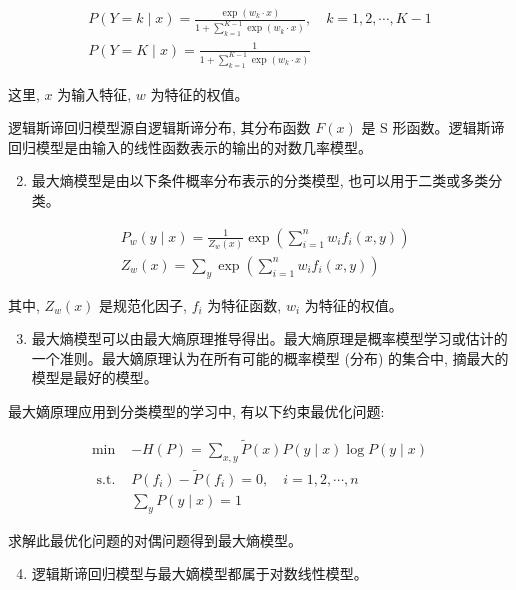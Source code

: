 \documentclass[10pt]{article}
\begin{document}
\begin{CJK*}{UTF8}{bsmi}
$$
\begin{gathered}
P(Y=k \mid x)=\frac{\exp \left(w_{k} \cdot x\right)}{1+\sum_{k=1}^{K-1} \exp \left(w_{k} \cdot x\right)}, \quad k=1,2, \cdots, K-1 \\
P(Y=K \mid x)=\frac{1}{1+\sum_{k=1}^{K-1} \exp \left(w_{k} \cdot x\right)}
\end{gathered}
$$

这里, $x$ 为输入特征, $w$ 为特征的权值。

逻辑斯谛回归模型源自逻辑斯谛分布, 其分布函数 $F(x)$ 是 $\mathrm{S}$ 形函数。逻辑斯谛回归模型是由输入的线性函数表示的输出的对数几率模型。

\begin{enumerate}
  \setcounter{enumi}{1}
  \item 最大熵模型是由以下条件概率分布表示的分类模型, 也可以用于二类或多类分类。
\end{enumerate}

$$
\begin{aligned}
& P_{w}(y \mid x)=\frac{1}{Z_{w}(x)} \exp \left(\sum_{i=1}^{n} w_{i} f_{i}(x, y)\right) \\
& Z_{w}(x)=\sum_{y} \exp \left(\sum_{i=1}^{n} w_{i} f_{i}(x, y)\right)
\end{aligned}
$$

其中, $Z_{w}(x)$ 是规范化因子, $f_{i}$ 为特征函数, $w_{i}$ 为特征的权值。

\begin{enumerate}
  \setcounter{enumi}{2}
  \item 最大熵模型可以由最大熵原理推导得出。最大熵原理是概率模型学习或估计的一个准则。最大嫡原理认为在所有可能的概率模型 (分布) 的集合中, 摘最大的模型是最好的模型。
\end{enumerate}

最大嫡原理应用到分类模型的学习中, 有以下约束最优化问题:

$$
\begin{array}{ll}
\min & -H(P)=\sum_{x, y} \tilde{P}(x) P(y \mid x) \log P(y \mid x) \\
\text { s.t. } & P\left(f_{i}\right)-\tilde{P}\left(f_{i}\right)=0, \quad i=1,2, \cdots, n \\
& \sum_{y} P(y \mid x)=1
\end{array}
$$

求解此最优化问题的对偶问题得到最大熵模型。

\begin{enumerate}
  \setcounter{enumi}{3}
  \item 逻辑斯谛回归模型与最大嫡模型都属于对数线性模型。


\end{enumerate}
\end{CJK*}
\end{document}
